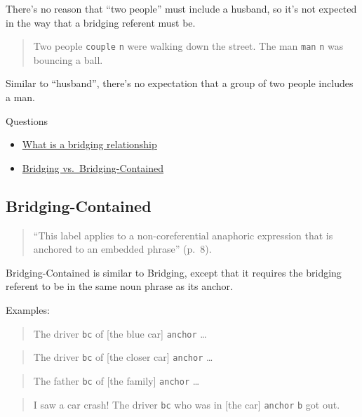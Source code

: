 \documentclass[
]{book}
\providecommand{\tightlist}{%
  \setlength{\itemsep}{0pt}\setlength{\parskip}{0pt}}
\begin{document}
There's no reason that ``two people'' must include a husband,
so it's not expected in the way that a bridging referent must be.

\begin{quote}
Two people \texttt{couple} \texttt{n} were walking down the street.
The man \texttt{man} \texttt{n} was bouncing a ball.
\end{quote}

Similar to ``husband'',
there's no expectation that a group of two people includes a man.

Questions

\begin{itemize}
\tightlist
\item
  \protect\hyperlink{bridging-relationships}{What is a bridging relationship}
\item
  \protect\hyperlink{bridging-vs.-bridging-contained}{Bridging vs.~Bridging-Contained}
\end{itemize}

\hypertarget{bridging-contained}{%
\subsection{Bridging-Contained}\label{bridging-contained}}

\begin{quote}
``This label applies to a non-coreferential anaphoric expression that is anchored to an embedded phrase'' (p.~8).
\end{quote}

Bridging-Contained is similar to Bridging, except that it requires the bridging referent to be in the same noun phrase as its anchor.

Examples:

\begin{quote}
The driver \texttt{bc} of {[}the blue car{]} \texttt{anchor} \ldots{}
\end{quote}

\begin{quote}
The driver \texttt{bc} of {[}the closer car{]} \texttt{anchor} \ldots{}
\end{quote}

\begin{quote}
The father \texttt{bc} of {[}the family{]} \texttt{anchor} \ldots{}
\end{quote}

\begin{quote}
I saw a car crash!
The driver \texttt{bc} who was in {[}the car{]} \texttt{anchor} \texttt{b} got out.
\end{quote}
\end{document}
